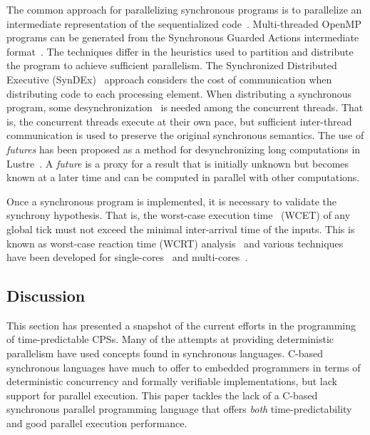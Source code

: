 The common approach for parallelizing synchronous programs is to 
parallelize an intermediate representation of the sequentialized 
code~\cite{distributed_reactive_systems_survey,wcrt_esterel_multicores,YuanYR11,distributed_synchronous_dependency_driven,distributed_reactive_systems_automatic,timed_esterel_distribution_emperor,timed_multiclock_multithreaded}.
Multi-threaded OpenMP programs can be generated from the Synchronous 
Guarded Actions intermediate format~\cite{multiprocessing_openmp_synchronous}.
The techniques differ in the heuristics used to partition
and distribute the program to achieve sufficient parallelism.
The Synchronized Distributed Executive 
(SynDEx)~\cite{distributed_synchronous_semantics_preserving} 
approach considers the cost of communication when distributing
code to each processing element. When distributing a synchronous 
program, some desynchronization~\cite{BenvenisteCG00,GiraultNP06,distributed_synchronous_desynchronize_modes} 
is needed among the concurrent threads. That is, the concurrent 
threads execute at their own pace, but sufficient inter-thread 
communication is used to preserve the original synchronous 
semantics. The use of \emph{futures} has been proposed as a method for 
desynchronizing long computations in 
Lustre~\cite{multiprocessing_lustre_futures}. A \emph{future}
is a proxy for a result that is initially unknown but becomes 
known at a later time and can be computed in parallel with 
other computations. 

Once a synchronous program is implemented, it is necessary
to validate the synchrony hypothesis. 
That is, the worst-case execution time~\cite{Wilhelm14,wcet_methods_survey} 
(WCET) of any global tick must not exceed the minimal 
inter-arrival time of the inputs. This is known as 
worst-case reaction time (WCRT) 
analysis~\cite{wcrt_concurrent_reactive,wcrt_algebra_interfaces} and
various techniques have been developed for 
single-cores~\cite{wcrt_algebra_interfaces,JuHRC12,WangRA13,RaymondMPC13,wcrt_taxys,AndalamRG11,wcrt_concurrent_reactive,KuoSR11} 
and multi-cores~\cite{wcrt_esterel_multicores,YipRAG13}.



\subsection{Discussion}
This section has presented a snapshot of the current efforts
in the programming of time-predictable CPSs.
Many of the attempts at providing deterministic
parallelism have used concepts found in
synchronous languages. C-based synchronous languages
have much to offer to embedded programmers in terms of
deterministic concurrency and formally verifiable
implementations, but lack support for parallel execution.
This paper tackles the lack of a C-based synchronous
parallel programming language that offers \emph{both} 
time-predictability and good parallel execution performance.
